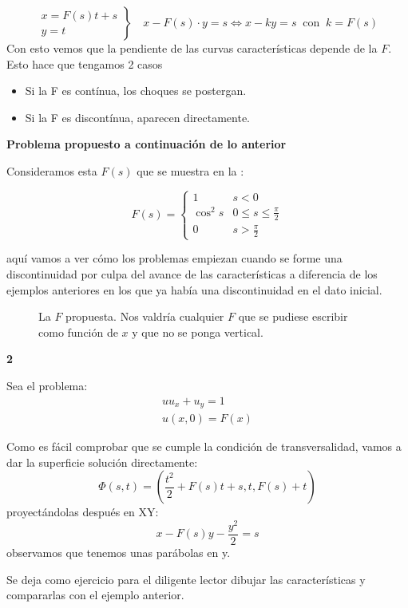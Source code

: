 \begin{example}[1]
		\[
		\left.
		\begin{array}{r}
		x = F(s)t + s \\
		y = t
		\end{array}
		\right\} \quad x - F(s)\cdot y = s \iff x - ky = s \ \text{ con } \ k = F(s)
		\]
		Con esto vemos que la pendiente de las curvas características depende de la $F$. Esto hace que tengamos 2 casos
		\begin{itemize}
			\item Si la F es contínua, los choques se postergan.
			\item Si la F es discontínua, aparecen directamente.
		\end{itemize}


	\end{example}

	\textbf{Problema propuesto a continuación de lo anterior}

	Consideramos esta $F(s)$ que se muestra en la :

	\[
	F(s) =
	\begin{cases}
	1 & s < 0 \\
	\cos^2 s & 0 \leq s \leq \frac{\pi}{2} \\
	0 & s > \frac{\pi}{2}
	\end{cases}
	\]

	aquí vamos a ver cómo los problemas empiezan cuando se forme una discontinuidad por culpa del avance de las características a diferencia de los ejemplos anteriores en los que ya había una discontinuidad en el dato inicial.

	\begin{figure}[hbtp]
		\centering
		\caption{La $F$ propuesta. Nos valdría cualquier $F$ que se pudiese escribir como función de $x$ y que no se ponga vertical.}
		\label{fig:Ejemplo-02-09-suave}
	\end{figure}

	\begin{example}{\bf 2}

		\noindent Sea el problema:
		\[
		\begin{array}{l}
			u u_x + u_y = 1 \\
			u(x,0) = F(x)
		\end{array}
		\]

		Como es fácil comprobar que se cumple la condición de transversalidad, vamos a dar la superficie solución directamente:
		\[ \Phi(s,t) = (\frac{t^2}{2} + F(s) t + s, t, F(s) + t) \] proyectándolas después en XY: \[ x - F(s)y - \frac{y^2}{2} = s \] observamos que tenemos unas parábolas en y.

		Se deja como ejercicio para el diligente lector dibujar las características y compararlas con el ejemplo anterior.

	\end{example}

